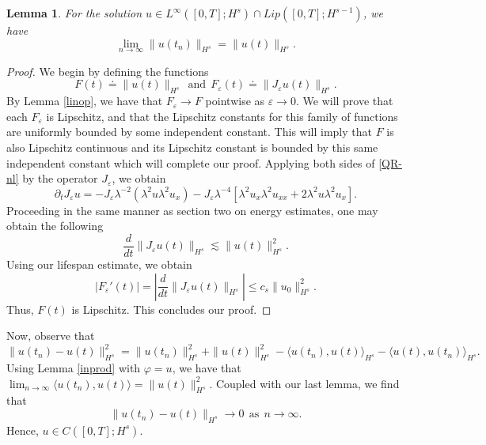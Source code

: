\documentclass[reqno]{amsart}
\theoremstyle{plain}
\newtheorem{lemma}{Lemma}[section]
\numberwithin{equation}{section}
\newcommand{\p}{\partial}
\newcommand{\ee}{\varepsilon}
\begin{document}
\begin{lemma}
    For the solution $u \in L^\infty([0,T]; H^s)\cap Lip([0,T];H^{s-1})$, we have $$\lim_{n \to \infty}\|u(t_n)\|_{H^s} = \|u(t)\|_{H^s}.$$
\end{lemma}
\begin{proof}
    We begin by defining the functions 
    \begin{equation}
        F(t) \doteq \|u(t)\|_{H^s} \ \ \text{and} \ \ F_\ee(t) \doteq \|J_\ee u(t)\|_{H^s}.
    \end{equation}
    By Lemma \ref{linop}, we have that $F_\ee \to F$ pointwise as $\ee \to 0$.  We will prove that each $F_\ee$ is Lipschitz, and that the Lipschitz constants for this family of functions are uniformly bounded by some independent constant.  This will imply that $F$ is also Lipschitz continuous and its Lipschitz constant is bounded by this same independent constant which will complete our proof.  Applying both sides of \eqref{QR-nl} by the operator $J_\ee$, we obtain
    \begin{equation}
        \p_tJ_\ee u = -J_\ee\lambda^{-2} (\lambda^2 u \lambda^2 u_x)-J_\ee\lambda^{-4}[\lambda^2 u_x \lambda^2 u_{xx}+2\lambda^2 u \lambda^2 u_x].
    \end{equation}
    Proceeding in the same manner as section two on energy estimates, one may obtain the following $$\frac{d}{dt}\|J_\ee u(t)\|_{H^s} \lesssim \|u(t)\|_{H^s}^2.$$
    Using our lifespan estimate, we obtain $$|F_\ee'(t)| = \left|\frac{d}{dt}\|J_\ee u(t)\|_{H^s}\right|\leq c_s\|u_0\|_{H^s}^2.$$ 
    Thus, $F(t)$ is Lipschitz.  This concludes our proof.
\end{proof}



Now, observe that
\begin{equation}
    \|u(t_n) - u(t)\|_{H^s}^2 = \|u(t_n)\|_{H^s}^2+\|u(t)\|_{H^s}^2 - \langle u(t_n),u(t)\rangle_{H^s} - \langle u(t),u(t_n)\rangle_{H^s}.
\end{equation}
Using Lemma \ref{inprod} with $\varphi = u$, we have that $\lim_{n \to \infty}\langle u(t_n),u(t)\rangle=\|u(t)\|_{H^s}^2$.  Coupled with our last lemma, we find that $$\|u(t_n) - u(t)\|_{H^s} \to 0 \ \ \text{as} \ \ n \to \infty.$$  Hence, $u \in C([0,T]; H^s).$  
\end{document}
